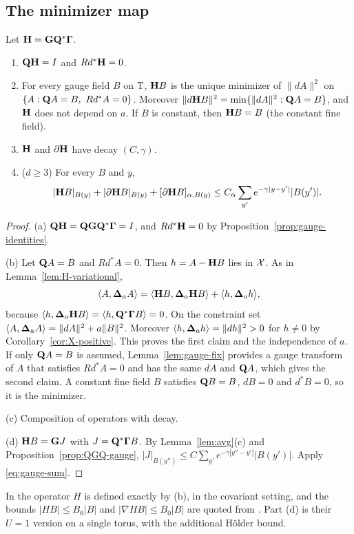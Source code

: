 \subsection{The minimizer map}

\begin{theorem}\label{thm:H-gauge}
Let $\mathbf H=\mathbf G\mathbf Q^*\boldsymbol\Gamma$.
\begin{enumerate}[label=(\alph*)]
\item $\mathbf Q\mathbf H=I$ and $Rd^*\mathbf H=0$.
\item For every gauge field $B$ on $\mathbb T$, $\mathbf H B$ is the unique minimizer of $\|dA\|^2$ on $\{A:\mathbf Q A=B,\ Rd^*A=0\}$. Moreover $\|d\mathbf H B\|^2=\min\{\|dA\|^2:\mathbf Q A=B\}$, and $\mathbf H$ does not depend on $a$. If $B$ is constant, then $\mathbf H B=B$ (the constant fine field).
\item $\mathbf H$ and $\partial\mathbf H$ have decay $(C,\gamma)$.
\item ($d\ge3$) For every $B$ and $y$,
\[
|\mathbf H B|_{B(y)}+|\partial\mathbf H B|_{B(y)}+[\partial\mathbf H B]_{\alpha,B(y)}\le C_\alpha\sum_{y'}e^{-\gamma|y-y'|}|B(y')| .
\]
\end{enumerate}
\end{theorem}

\begin{proof}
(a) $\mathbf Q\mathbf H=\mathbf Q\mathbf G\mathbf Q^*\boldsymbol\Gamma=I$, and $Rd^*\mathbf H=0$ by Proposition~\ref{prop:gauge-identities}.

(b) Let $\mathbf Q A=B$ and $Rd^*A=0$. Then $h=A-\mathbf H B$ lies in $\mathcal X$. As in Lemma~\ref{lem:H-variational},
\[
\langle A,\boldsymbol{\Delta}_aA\rangle=\langle \mathbf H B,\boldsymbol{\Delta}_a\mathbf H B\rangle+\langle h,\boldsymbol{\Delta}_ah\rangle,
\]
because $\langle h,\boldsymbol{\Delta}_a\mathbf H B\rangle=\langle h,\mathbf Q^*\boldsymbol\Gamma B\rangle=0$. On the constraint set $\langle A,\boldsymbol{\Delta}_aA\rangle=\|dA\|^2+a\|B\|^2$. Moreover $\langle h,\boldsymbol{\Delta}_ah\rangle=\|dh\|^2>0$ for $h\ne0$ by Corollary~\ref{cor:X-positive}. This proves the first claim and the independence of $a$. If only $\mathbf Q A=B$ is assumed, Lemma~\ref{lem:gauge-fix} provides a gauge transform of $A$ that satisfies $Rd^*A=0$ and has the same $dA$ and $\mathbf Q A$, which gives the second claim. A constant fine field $B$ satisfies $\mathbf Q B=B$, $dB=0$ and $d^*B=0$, so it is the minimizer.

(c) Composition of operators with decay.

(d) $\mathbf H B=\mathbf G J$ with $J=\mathbf Q^*\boldsymbol\Gamma B$. By Lemma~\ref{lem:avg}(c) and Proposition~\ref{prop:QGQ-gauge}, $|J|_{B(y'')}\le C\sum_{y'}e^{-\gamma|y''-y'|}|B(y')|$. Apply \eqref{eq:gauge-sum}.
\end{proof}

\begin{remark}
In \cite[(45)--(46)]{BalVar} the operator $H$ is defined exactly by (b), in the covariant setting, and the bounds $|HB|\le B_0|B|$ and $|\nabla HB|\le B_0|B|$ are quoted from \cite[Theorem~3.12]{BalBackground}. Part (d) is their $U=1$ version on a single torus, with the additional H\"older bound.
\end{remark}

